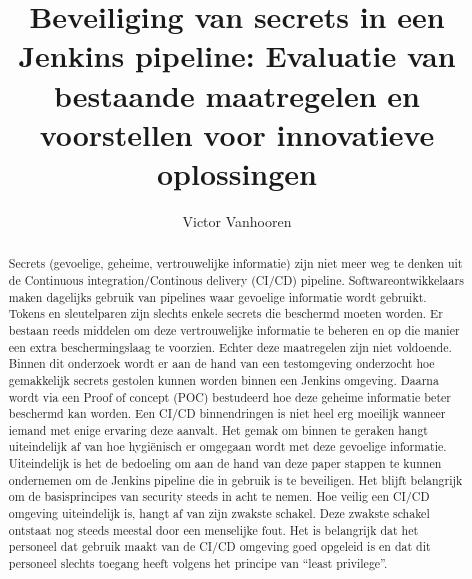 \documentclass{hogent-article}
\title{Beveiliging van secrets in een Jenkins pipeline: Evaluatie van bestaande maatregelen en voorstellen voor innovatieve oplossingen 
}
\author{Victor Vanhooren}
\begin{document}
\begin{abstract}
  Secrets (gevoelige, geheime, vertrouwelijke informatie) zijn niet meer weg te denken uit de Continuous integration/Continous delivery (CI/CD) pipeline. Softwareontwikkelaars maken dagelijks gebruik van pipelines waar gevoelige informatie wordt gebruikt. Tokens en sleutelparen zijn slechts enkele secrets die beschermd moeten worden. Er bestaan reeds middelen om deze vertrouwelijke informatie te beheren en op die manier een extra beschermingslaag te voorzien. Echter deze maatregelen zijn niet voldoende. Binnen dit onderzoek wordt er aan de hand van een testomgeving onderzocht hoe gemakkelijk secrets gestolen kunnen worden binnen een Jenkins omgeving. Daarna wordt via een Proof of concept (POC) bestudeerd hoe deze geheime informatie beter beschermd kan worden. Een CI/CD binnendringen is niet heel erg moeilijk wanneer iemand met enige ervaring deze aanvalt. Het gemak om binnen te geraken hangt uiteindelijk af van hoe hygiënisch er omgegaan wordt met deze gevoelige informatie. Uiteindelijk is het de bedoeling om aan de hand van deze paper stappen te kunnen ondernemen om de Jenkins pipeline die in gebruik is te beveiligen. Het blijft belangrijk om de basisprincipes van security steeds in acht te nemen. Hoe veilig een CI/CD omgeving uiteindelijk is, hangt af van zijn zwakste schakel. Deze zwakste schakel ontstaat nog steeds meestal door een menselijke fout. Het is belangrijk dat het personeel dat gebruik maakt van de CI/CD omgeving goed opgeleid is en dat dit personeel slechts toegang heeft volgens het principe van “least privilege”.
\end{abstract}

\tableofcontents



\printbibliography[heading=bibintoc]
\end{document}
